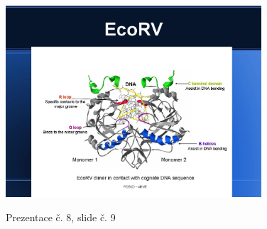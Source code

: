 \documentclass[DIV=8]{scrreprt}
\begin{document}
\begin{figure}
    \caption{Prezentace č. 8, slide č. 9}
    \includegraphics[width=0.85\textwidth]{slides-8/slide-9.jpg}
    \centering
    \label{slides-8-slide-9}
\end{figure}
\end{document}
